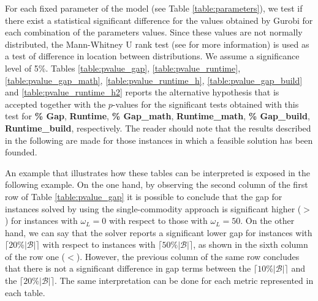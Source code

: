 \documentclass[a4paper,  review, authoryear, 1p.]{elsarticle}
\begin{document}
{		For each fixed parameter of the model (see Table \ref{table:parameters}), we test if there exist a statistical significant difference for the values obtained by Gurobi for each combination of the parameters values. Since these values are not normally distributed, the Mann-Whitney U rank test (see \cite{mcknight2010} for more information) is used as a test of difference in location between distributions. We assume a significance level of 5\%. Tables \ref{table:pvalue_gap}, \ref{table:pvalue_runtime}, \ref{table:pvalue_gap_math}, \ref{table:pvalue_runtime_h}, \ref{table:pvalue_gap_build} and \ref{table:pvalue_runtime_h2} reports the alternative hypothesis that is accepted together with the $p$-values for the significant tests obtained with this test for \textbf{\% Gap}, \textbf{Runtime}, \textbf{\% Gap\_{math}}, \textbf{Runtime\_{math}}, \textbf{\% Gap\_{build}}, \textbf{Runtime\_{build}}, respectively. The reader should note that the results described in the following are made for those instances in which a feasible solution has been founded.

		An example that illustrates how these tables can be interpreted is exposed in the following example. On the one hand, by observing the second column of the first row of Table \ref{table:pvalue_gap} it is possible to conclude that the gap for instances solved by using the single-commodity approach is significant higher ($>$) for instances with $\omega_L=0$ with respect to those with $\omega_L=50$. On the other hand, we can say that the solver reports a significant lower gap for instances with $\lceil 20 \%|\mathcal B|\rceil$ with respect to instances with $\lceil 50 \%|\mathcal B|\rceil$, as shown in the sixth column of the row one ($<$). However, the previous column of the same row concludes that there is not a significant difference in gap terms between the $\lceil 10 \%|\mathcal B|\rceil$ and the $\lceil 20 \%|\mathcal B|\rceil$. The same interpretation can be done for each metric represented in each table.
		
}
\end{document}
